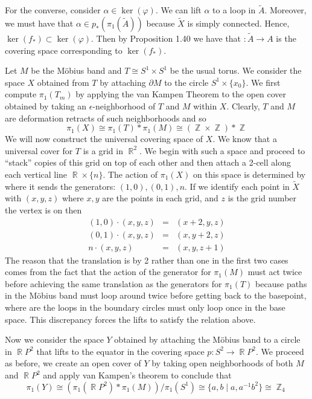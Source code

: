 \documentclass{article}
\DeclareMathOperator{\Z}{\mathbb{Z}}
\DeclareMathOperator{\R}{\mathbb{R}}
\newcommand{\exercise}[1]{\noindent{\textbf{Exercise #1:}}}
\begin{document}
For the converse, consider $\alpha \in \ker(\varphi)$. We can lift
$\alpha$ to a loop in $\tilde{A}$. Moreover, we must have that $\alpha
\in p_*(\pi_1(\tilde{A}))$ because $\tilde{X}$ is simply
connected. Hence, $\ker(f_*) \subset \ker(\varphi)$. Then by
Proposition 1.40 we have that $: \tilde{A}\to A$ is the covering space
corresponding to $\ker(f_*)$.

\exercise{1.3.21}

Let $M$ be the M\"{o}bius band and $T \cong S^1 \times S^1$ be the
usual torus. We consider the space $X$ obtained from $T$ by
attaching $\partial M$ to the circle $S^1 \times \{x_0\}$. We first
compute $\pi_1(T_m)$ by applying the van Kampen Theorem to the open
cover obtained by taking an $\epsilon$-neighborhood of $T$ and $M$
within $X$. Clearly, $T$ and $M$ are deformation retracts of such
neighborhoods and so
\[
\pi_1(X) \cong \pi_1(T) \ast \pi_1(M) \cong (\Z \times \Z) \ast \Z
\]
We will now construct the universal covering space of $X$. We know
that a universal cover for $T$ is a grid in $\R^2$. We begin with such
a space and proceed to ``stack'' copies of this grid on top of each
other and then attach a 2-cell along each vertical line $\R \times
\{n\}$. The action of $\pi_1(X)$ on this space is determined by where
it sends the generators: $(1,0), (0,1), n$. If we identify each point
in $\tilde{X}$ with $(x,y,z)$ where $x,y$ are the points in each grid,
and $z$ is the grid number the vertex is on then
\begin{eqnarray}
  (1,0)\cdot (x,y,z) &=& (x+2,y,z) \nonumber\\
  (0,1)\cdot (x,y,z) &=& (x,y+2,z) \nonumber\\
  n \cdot (x,y,z) &=& (x,y,z+1) \nonumber
\end{eqnarray}
The reason that the translation is by 2 rather than one in the first
two cases comes from the fact that the action of the generator for
$\pi_1(M)$ must act twice before achieving the same translation as the
generators for $\pi_1(T)$ because paths in the M\"{o}bius band must
loop around twice before getting back to the basepoint, where are the
loops in the boundary circles must only loop once in the base
space. This discrepancy forces the lifts to satisfy the relation
above.

Now we consider the space $Y$ obtained by attaching the M\"{o}bius
band to a circle in $\R P^2$ that lifts to the equator in the covering
space $p: S^2 \to \R P^2$. We proceed as before, we create an open
cover of $Y$ by taking open neighborhoods of both $M$ and $\R P^2$ and
apply van Kampen's theorem to conclude that
\[
\pi_1(Y) \cong (\pi_1(\R P^2) \ast \pi_1(M))/\pi_1(S^1) \cong \lbrace
a,b \mid a, a^{-1}b^2\rbrace \cong \Z_4
\]
\end{document}
